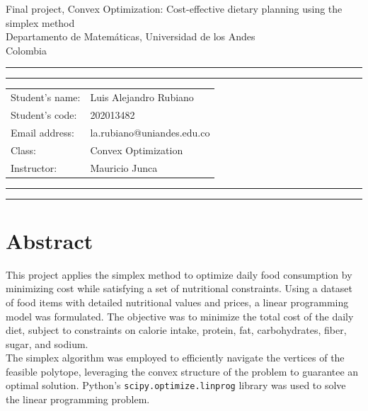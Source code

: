 \documentclass[10pt]{article}
\makeatletter
\newcommand{\studentname}{Luis Alejandro Rubiano}
\newcommand{\studentnumber}{202013482}
\newcommand{\researchcentre}{la.rubiano@uniandes.edu.co}
\newcommand{\projecttitle}{Convex Optimization}
\newcommand{\supervisor}{Mauricio Junca}
\makeatother
\begin{document}
\begin{center}
{\Huge{Final project, Convex Optimization: Cost-effective dietary planning using the simplex method}} \\
\vspace{2mm}
{\Large{Departamento de Matemáticas, Universidad de los Andes}} \\
\vspace{1mm}
{\Large{Colombia}}
\end{center}

\vspace{5mm}
\hrule
\vspace{1mm}
\hrule

\vspace{3mm}
\begin{tabular}{ll} 
Student's name:           	        & {\studentname}   \\ 
Student's code: 	        & {\studentnumber} \\ 
Email address: 	        & {\researchcentre}  \\ 
Class: 	& {\projecttitle}  \\ 
Instructor: 	    & {\supervisor}  \\ 
\end{tabular}

\vspace{3mm}
\hrule
\vspace{1mm}
\hrule

\hfill \break %

\section{Abstract}

This project applies the simplex method to optimize daily food consumption by minimizing cost while satisfying a set of nutritional constraints. Using a dataset of food items with detailed nutritional values and prices, a linear programming model was formulated. The objective was to minimize the total cost of the daily diet, subject to constraints on calorie intake, protein, fat, carbohydrates, fiber, sugar, and sodium.\\

The simplex algorithm was employed to efficiently navigate the vertices of the feasible polytope, leveraging the convex structure of the problem to guarantee an optimal solution. Python's \texttt{scipy.optimize.linprog} library was used to solve the linear programming problem.\\
\end{document}
